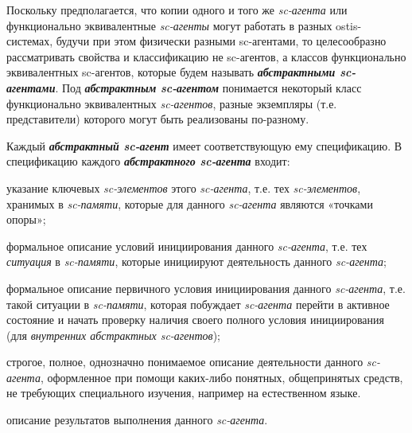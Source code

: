 Поскольку предполагается, что копии одного и того же \textit{sc-агента} или функционально эквивалентные \textit{sc-агенты} могут работать в разных ostis-системах, будучи при этом физически разными sc-агентами, то целесообразно рассматривать свойства и классификацию не sc-агентов, а классов функционально эквивалентных sc-агентов, которые будем называть \textbf{\textit{абстрактными sc-агентами}}.
Под \textbf{\textit{абстрактным sc-агентом}} понимается некоторый класс функционально эквивалентных \textit{sc-агентов}, разные экземпляры (т.е. представители) которого могут быть реализованы по-разному.
	
Каждый \textbf{\textit{абстрактный sc-агент}} имеет соответствующую ему спецификацию. В спецификацию каждого \textbf{\textit{абстрактного sc-агента}} входит:
\begin{textitemize}
	\item указание ключевых \textit{sc-элементов} этого \textit{sc-агента}, т.е. тех \textit{sc-элементов}, хранимых в \textit{sc-памяти}, которые для данного \textit{sc-агента} являются «точками опоры»;
	\item формальное описание условий инициирования данного \textit{sc-агента}, т.е. тех \textit{ситуация} в \textit{sc-памяти}, которые инициируют деятельность данного \textit{sc-агента};
	\item формальное описание первичного условия инициирования данного \textit{sc-агента}, т.е. такой ситуации в \textit{sc-памяти}, которая побуждает \textit{sc-агента} перейти в активное состояние и начать проверку наличия своего полного условия инициирования (для \textit{внутренних абстрактных sc-агентов});
	\item строгое, полное, однозначно понимаемое описание деятельности данного \textit{sc-агента}, оформленное при помощи каких-либо понятных, общепринятых средств, не требующих специального изучения, например на естественном языке.
	\item описание результатов выполнения данного \textit{sc-агента}.
\end{textitemize}

